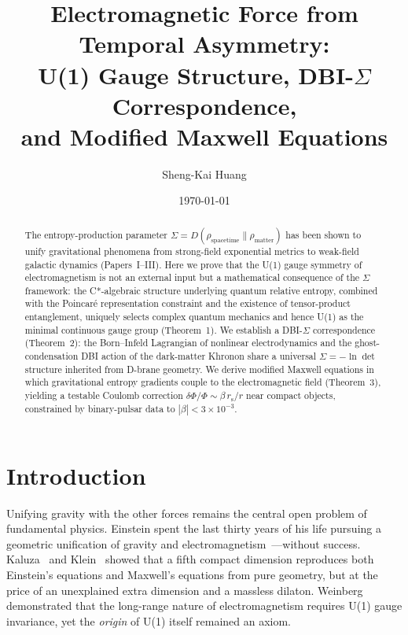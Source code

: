 \documentclass[prl,twocolumn,superscriptaddress,longbibliography]{revtex4-2}
\begin{document}
\title{Electromagnetic Force from Temporal Asymmetry:\\
U(1) Gauge Structure, DBI-$\Sigma$ Correspondence,\\
and Modified Maxwell Equations}

\author{Sheng-Kai Huang}

\date{\today}

\begin{abstract}
The entropy-production parameter
$\Sigma = D(\rho_{\mathrm{spacetime}}\|\rho_{\mathrm{matter}})$
has been shown to unify gravitational phenomena from strong-field
exponential metrics to weak-field galactic dynamics
(Papers~I--III).
Here we prove that the U(1) gauge symmetry of electromagnetism
is not an external input but a mathematical consequence of the
$\Sigma$ framework: the C*-algebraic structure underlying
quantum relative entropy, combined with the Poincar\'{e}
representation constraint and the existence of tensor-product
entanglement, uniquely selects complex quantum mechanics and hence
U(1) as the minimal continuous gauge group (Theorem~1).
We establish a DBI-$\Sigma$ correspondence (Theorem~2): the
Born--Infeld Lagrangian of nonlinear electrodynamics and the
ghost-condensation DBI action of the dark-matter Khronon share
a universal $\Sigma = -\ln\det$ structure inherited from D-brane
geometry.
We derive modified Maxwell equations in which gravitational
entropy gradients couple to the electromagnetic field
(Theorem~3), yielding a testable Coulomb correction
$\delta\Phi/\Phi \sim \beta\, r_{\mathrm{s}}/r$ near compact
objects, constrained by binary-pulsar data to
$|\beta| < 3 \times 10^{-3}$.
\end{abstract}

\maketitle

\section{Introduction}
\label{sec:intro}

Unifying gravity with the other forces remains the central
open problem of fundamental physics.
Einstein spent the last thirty years of his life pursuing a
geometric unification of gravity and
electromagnetism~\cite{Einstein1950}---without success.
Kaluza~\cite{Kaluza1921} and Klein~\cite{Klein1926} showed that
a fifth compact dimension reproduces both Einstein's equations
and Maxwell's equations from pure geometry, but at the price of
an unexplained extra dimension and a massless dilaton.
Weinberg~\cite{Weinberg1964} demonstrated that the long-range
nature of electromagnetism requires U(1) gauge invariance, yet
the \emph{origin} of U(1) itself remained an axiom.
\end{document}
